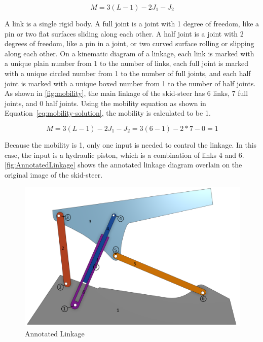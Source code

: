\documentclass[hidelinks]{article}
\begin{document}
    \begin{equation}
        \label{eq:grubler-kutzbach-mobility}
        M=3(L-1)-2J_1-J_2
    \end{equation}
    
    A link is a single rigid body. A full joint is a joint with 1 degree of freedom, like a pin or two flat surfaces sliding along each other. A half joint is a joint with 2 degrees of freedom, like a pin in a joint, or two curved surface rolling or slipping along each other. On a kinematic diagram of a linkage, each link is marked with a unique plain number from 1 to the number of links, each full joint is marked with a unique circled number from 1 to the number of full joints, and each half joint is marked with a unique boxed number from 1 to the number of half joints. As shown in \autoref{fig:mobility}, the main linkage of the skid-steer has 6 links, 7 full joints, and 0 half joints. Using the mobility equation as shown in Equation~\eqref{eq:mobility-solution}, the mobility is calculated to be 1.

    \begin{equation}
        \label{eq:mobility-solution}
        M=3(L-1)-2J_1-J_2=3(6-1)-2*7-0=1
    \end{equation}
    
    Because the mobility is 1, only one input is needed to control the linkage. In this case, the input is a hydraulic piston, which is a combination of links 4 and 6\@. \autoref{fig:AnnotatedLinkage} shows the annotated linkage diagram overlain on the original image of the skid-steer.
    
    \FloatBarrier\begin{figure}[ht]
        \centering
        \includegraphics[width=1\linewidth]{HonorsAnnotatedLinkage.png}
        \caption{Annotated Linkage}\label{fig:mobility}
    \end{figure}
\end{document}
